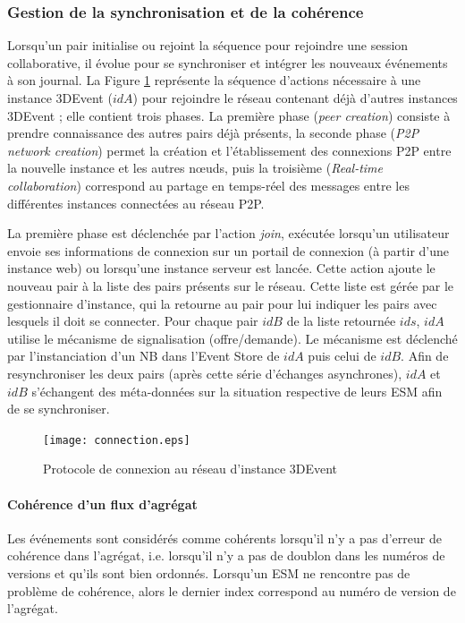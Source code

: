 \subsubsection{Gestion de la synchronisation et de la cohérence}
Lorsqu'un pair initialise ou rejoint la séquence pour 
rejoindre une session collaborative, il évolue pour se synchroniser et intégrer les 
nouveaux événements à son journal.
La Figure \ref{fig:connexionpairs} représente la séquence d'actions nécessaire à 
une instance 3DEvent ($idA$) pour rejoindre le réseau contenant déjà d'autres 
instances 3DEvent ; elle contient trois phases. La première phase (\textit{peer 
creation}) consiste à prendre connaissance des autres pairs déjà présents, la 
seconde phase (\textit{P2P network creation}) permet la création et l'établissement 
des connexions \gls{P2P} entre la nouvelle instance et les autres n\oe uds, puis la 
troisième (\textit{Real-time collaboration}) correspond au partage en temps-réel 
des messages entre les différentes instances connectées au réseau \gls{P2P}.

La première phase est déclenchée par l'action \textit{join}, exécutée lorsqu'un 
utilisateur envoie ses informations de connexion sur un portail de connexion (à 
partir d'une instance 
web) ou lorsqu'une instance serveur est lancée. Cette action ajoute le nouveau 
pair à la liste des pairs présents sur le réseau. Cette liste est gérée par le 
gestionnaire d'instance, qui la retourne au pair pour lui indiquer les pairs 
avec lesquels il doit se connecter.
Pour chaque pair $idB$ de la liste retournée $ids$, $idA$ utilise le mécanisme de 
signalisation (offre/demande). Le mécanisme est déclenché par l'instanciation d'un 
\gls{NB} dans l'Event Store de $idA$ puis celui de $idB$. Afin de resynchroniser 
les deux pairs (après cette série d'échanges asynchrones), $idA$ et $idB$ 
s'échangent des méta-données sur la situation respective de leurs \gls{ESM} 
afin de se synchroniser.

\begin{figure}[h]
	\noindent
	\centering
	\texttt{[image: connection.eps]}
	\caption{Protocole de connexion au réseau d'instance 3DEvent}
	\label{fig:connexionpairs}
\end{figure}

\paragraph{Cohérence d'un flux d'agrégat}
Les événements sont considérés comme \og cohérents\fg{}  lorsqu'il n'y a pas 
d'erreur de cohérence dans l'agrégat, i.e. lorsqu'il n'y a pas de doublon dans les 
numéros de versions et qu'ils sont bien ordonnés. Lorsqu'un \gls{ESM} ne 
rencontre pas de problème de cohérence, alors le 
dernier index correspond au numéro de version de l'agrégat. 


